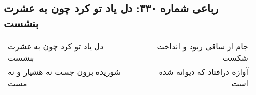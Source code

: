 \begin{center}
\section*{رباعی شماره ۳۳۰: دل یاد تو کرد چون به عشرت بنشست}
\label{sec:0330}
\begin{longtable}{l p{0.5cm} r}
دل یاد تو کرد چون به عشرت بنشست
&&
جام از ساقی ربود و انداخت شکست
\\
شوریده برون جست نه هشیار و نه مست
&&
آوازه درافتاد که دیوانه شده است
\\
\end{longtable}
\end{center}
